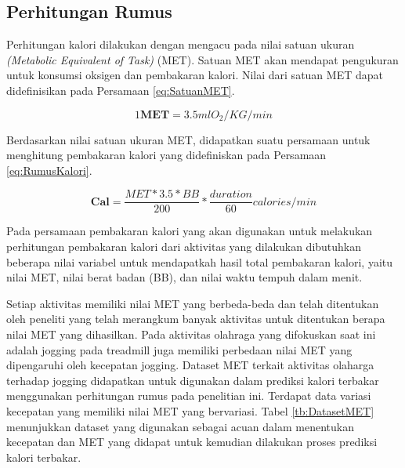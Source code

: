 \subsection{Perhitungan Rumus}
\label{subsec:PrediksiPerhitungan}

Perhitungan kalori dilakukan dengan mengacu pada nilai satuan ukuran \emph{(Metabolic Equivalent of Task)} (MET). Satuan MET akan mendapat pengukuran untuk konsumsi oksigen dan pembakaran kalori. Nilai dari satuan MET dapat didefinisikan pada Persamaan \ref{eq:SatuanMET}.

\begin{equation}
  \label{eq:SatuanMET}
  1 \mathbf{MET} = 3.5 ml O_2  / KG / min
\end{equation}

Berdasarkan nilai satuan ukuran MET, didapatkan suatu persamaan untuk menghitung pembakaran kalori yang didefiniskan pada Persamaan \ref{eq:RumusKalori}.

\begin{equation}
  \label{eq:RumusKalori}
  \mathbf{Cal} = \frac{MET * 3.5 * BB}{200} * \frac{duration}{60} calories / min
\end{equation}

Pada persamaan pembakaran kalori yang akan digunakan untuk melakukan perhitungan pembakaran kalori dari aktivitas yang dilakukan dibutuhkan beberapa nilai variabel untuk mendapatkah hasil total pembakaran kalori, yaitu nilai MET, nilai berat badan (BB), dan nilai waktu tempuh dalam menit.

Setiap aktivitas memiliki nilai MET yang berbeda-beda dan telah ditentukan oleh peneliti yang telah merangkum banyak aktivitas untuk ditentukan berapa nilai MET yang dihasilkan. Pada aktivitas olahraga yang difokuskan saat ini adalah jogging pada treadmill juga memiliki perbedaan nilai MET yang dipengaruhi oleh kecepatan jogging. Dataset MET terkait aktivitas olaharga terhadap jogging didapatkan untuk digunakan dalam prediksi kalori terbakar menggunakan perhitungan rumus pada penelitian ini. Terdapat data variasi kecepatan yang memiliki nilai MET yang bervariasi. Tabel \ref{tb:DatasetMET} menunjukkan dataset yang digunakan sebagai acuan dalam menentukan kecepatan dan MET yang didapat untuk kemudian dilakukan proses prediksi kalori terbakar.


